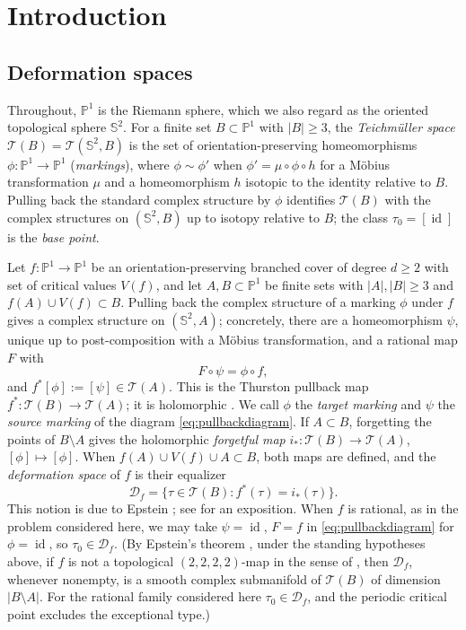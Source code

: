 \documentclass[11pt]{article}
\newcommand{\Pone}{\mathbb P^1}
\newcommand{\Sph}{\mathbb S^2}
\newcommand{\Teich}{\mathcal T}
\newcommand{\D}{\mathcal D}
\newcommand{\id}{\operatorname{id}}
\theoremstyle{remark}
\numberwithin{equation}{section}
\begin{document}
\section{Introduction}

\subsection{Deformation spaces}\label{sec:defspaces}

Throughout, $\Pone$ is the Riemann sphere, which we also regard as the
oriented topological sphere $\Sph$. For a finite set $B\subset\Pone$ with
$|B|\ge3$, the \emph{Teichm\"uller space} $\Teich(B)=\Teich(\Sph,B)$ is the
set of orientation-preserving homeomorphisms $\phi\colon\Pone\to\Pone$
(\emph{markings}), where $\phi\sim\phi'$ when $\phi'=\mu\circ\phi\circ h$
for a M\"obius transformation $\mu$ and a homeomorphism $h$ isotopic to the
identity relative to $B$. Pulling back the standard complex structure by
$\phi$ identifies $\Teich(B)$ with the complex structures on $(\Sph,B)$ up
to isotopy relative to $B$; the class $\tau_0=[\id]$ is the \emph{base
point}.

Let $f\colon\Pone\to\Pone$ be an orientation-preserving branched cover of
degree $d\ge2$ with set of critical values $V(f)$, and let $A,B\subset\Pone$
be finite sets with $|A|,|B|\ge3$ and $f(A)\cup V(f)\subset B$.
Pulling back the complex structure of a marking $\phi$ under $f$ gives a
complex structure on $(\Sph,A)$; concretely, there are a homeomorphism
$\psi$, unique up to post-composition with a M\"obius transformation, and a
rational map $F$ with
\begin{equation}\label{eq:pullbackdiagram}
 F\circ\psi=\phi\circ f ,
\end{equation}
and $f^*[\phi]:=[\psi]\in\Teich(A)$. This is the Thurston pullback map
$f^*\colon\Teich(B)\to\Teich(A)$; it is holomorphic
\cite[\S1.3, Prop.\ 1.4]{BCT}. We call $\phi$ the \emph{target marking} and
$\psi$ the \emph{source marking} of the diagram
\eqref{eq:pullbackdiagram}. If $A\subset B$, forgetting the points of
$B\setminus A$ gives the holomorphic \emph{forgetful map}
$i_*\colon\Teich(B)\to\Teich(A)$, $[\phi]\mapsto[\phi]$. When
$f(A)\cup V(f)\cup A\subset B$, both maps are defined, and the
\emph{deformation space} of $f$ is their equalizer
\[
 \D_f=\{\tau\in\Teich(B):f^*(\tau)=i_*(\tau)\}.
\]
This notion is due to Epstein \cite{Ep}; see \cite[\S1.4]{BCT} for an
exposition. When $f$ is rational, as in the problem considered here, we
may take $\psi=\id$, $F=f$ in \eqref{eq:pullbackdiagram} for $\phi=\id$,
so $\tau_0\in\D_f$. (By Epstein's theorem \cite[Thm.\ 1.5]{BCT}, under the
standing hypotheses above, if $f$ is not a topological $(2,2,2,2)$-map in
the sense of \cite[\S1.4]{BCT}, then $\D_f$, whenever nonempty, is a smooth
complex submanifold of $\Teich(B)$ of dimension $|B\setminus A|$. For the
rational family considered here $\tau_0\in\D_f$, and the periodic critical
point excludes the exceptional type.)
\end{document}
